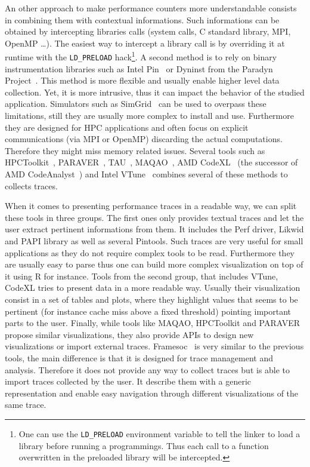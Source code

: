 An other approach to make performance counters more understandable consists in combining them with contextual informations.
Such informations can be obtained by intercepting libraries calls (system calls, C standard library, \gls{MPI}, \gls{OpenMP} \ldots).
The easiest way to intercept a library call is by overriding it at runtime with the \texttt{LD\_PRELOAD} hack\footnote{
    One can use the \texttt{LD\_PRELOAD} environment variable to tell the linker to load a library before running a programmings.
    Thus each call to a function overwritten in the preloaded library will be intercepted.}.
A second method is to rely on binary instrumentation libraries such as \gls{Intel} \gls{Pin}~\cite{Luk05Pin} or Dyninst from the Paradyn Project~\cite{Miller95Paradyn}.
This method is more flexible and usually enable higher level data collection.
Yet, it is more intrusive, thus it can impact the behavior of the studied application.
Simulators such as \gls{SimGrid}~\cite{Casanova14Versatile} can be used to overpass these limitations, still they are usually more complex to install and use.
Furthermore they are designed for \gls{HPC} applications and often focus on explicit communications (via \gls{MPI} or \gls{OpenMP}) discarding the actual computations.
Therefore they might miss memory related issues.
Several tools such as \gls{HPCToolkit}~\cite{Adhianto10HPCTOOLKIT}, \gls{PARAVER}~\cite{Pillet95PARAVER}, \gls{TAU}~\cite{Shende06Tau}, \gls{MAQAO}~\cite{Djoudi05MAQAO}, \gls{AMD} \gls{CodeXL}~\cite{AMD16CodeXL} (the successor of \gls{AMD} \gls{CodeAnalyst}~\cite{Drongowski08introduction}) and \gls{Intel} \gls{VTune}~\cite{Reinders05VTune} combines several of these methods to collects traces.

When it comes to presenting performance traces in a readable way, we can split these tools in three groups.
The first ones only provides textual traces and let the user extract pertinent informations from them.
It includes the \gls{Perf} driver, \gls{Likwid} and \gls{PAPI} library as well as several \glspl{Pintool}.
Such traces are very useful for small applications as they do not require complex tools to be read.
Furthermore they are usually easy to parse thus one can build more complex visualization on top of it using \gls{R} for instance.
Tools from the second group, that includes \gls{VTune}, \gls{CodeXL} tries to present data in a more readable way.
Usually their visualization consist in a set of tables and plots, where they highlight values that seems to be pertinent (for instance cache miss above a fixed threshold) pointing important parts to the user.
Finally, while tools like \gls{MAQAO}, \gls{HPCToolkit} and \gls{PARAVER} propose similar visualizations, they also provide \glspl{API} to design new visualizations or import external traces.
\gls{Framesoc}~\cite{Pagano13Trace} is very similar to the previous tools, the main difference is that it is designed for trace management and analysis.
Therefore it does not provide any way to collect traces but is able to import traces collected by the user.
It describe them with a generic representation and enable easy navigation through different visualizations of the same trace.

